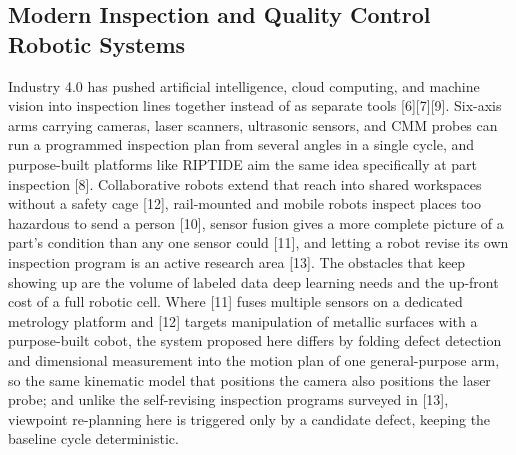 \documentclass[conference]{IEEEtran}
\begin{document}
\subsection{Modern Inspection and Quality Control Robotic Systems}
Industry 4.0 has pushed artificial intelligence, cloud computing, and machine vision into inspection lines together instead of as separate tools {[}6{]}{[}7{]}{[}9{]}. Six-axis arms carrying cameras, laser scanners, ultrasonic sensors, and CMM probes can run a programmed inspection plan from several angles in a single cycle, and purpose-built platforms like RIPTIDE aim the same idea specifically at part inspection {[}8{]}. Collaborative robots extend that reach into shared workspaces without a safety cage {[}12{]}, rail-mounted and mobile robots inspect places too hazardous to send a person {[}10{]}, sensor fusion gives a more complete picture of a part's condition than any one sensor could {[}11{]}, and letting a robot revise its own inspection program is an active research area {[}13{]}. The obstacles that keep showing up are the volume of labeled data deep learning needs and the up-front cost of a full robotic cell. Where {[}11{]} fuses multiple sensors on a dedicated metrology platform and {[}12{]} targets manipulation of metallic surfaces with a purpose-built cobot, the system proposed here differs by folding defect detection and dimensional measurement into the motion plan of one general-purpose arm, so the same kinematic model that positions the camera also positions the laser probe; and unlike the self-revising inspection programs surveyed in {[}13{]}, viewpoint re-planning here is triggered only by a candidate defect, keeping the baseline cycle deterministic.
\end{document}
